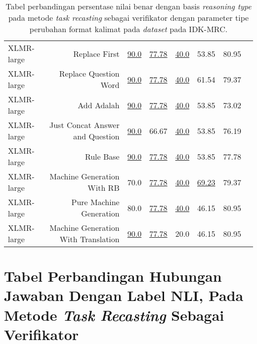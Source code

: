 \begin{table}[H]
\begin{tabular}{lrrrrrrr}
XLMR-large &Replace First &\underline{90.0} &\underline{77.78} &\underline{40.0} &53.85 &80.95 \\
XLMR-large &Replace Question Word &\underline{90.0} &\underline{77.78} &\underline{40.0} &61.54 &79.37 \\
XLMR-large &Add Adalah &\underline{90.0} &\underline{77.78} &\underline{40.0} &53.85 &73.02 \\
XLMR-large &Just Concat Answer and Question &\underline{90.0} &66.67 &\underline{40.0} &53.85 &76.19 \\
XLMR-large &Rule Base &\underline{90.0} &\underline{77.78} &\underline{40.0} &53.85 &77.78 \\
XLMR-large &Machine Generation With RB &70.0 &\underline{77.78} &\underline{40.0} &\underline{69.23} &79.37 \\
XLMR-large &Pure Machine Generation &80.0 &\underline{77.78} &\underline{40.0} &46.15 &80.95 \\
XLMR-large &Machine Generation With Translation &\underline{90.0} &\underline{77.78} &20.0 &46.15 &80.95 \\
\bottomrule
\end{tabular}
\caption{Tabel perbandingan persentase nilai benar dengan basis \emph{reasoning type} pada metode \emph{task recasting} sebagai verifikator dengan parameter tipe perubahan format kalimat pada \emph{dataset} pada IDK-MRC.}
\end{table}

\section*{Tabel Perbandingan Hubungan Jawaban Dengan Label NLI, Pada Metode \emph{Task Recasting} Sebagai Verifikator}

